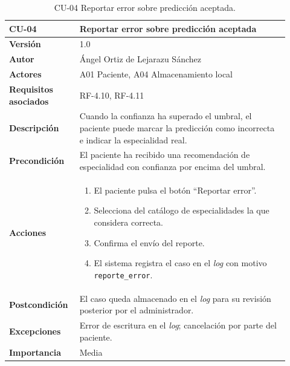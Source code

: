 \begin{table}[H]
	\centering
	\begin{tabular}{ p{0.21\linewidth} p{0.71\linewidth} }
		\toprule
		\textbf{CU-04}    & \textbf{Reportar error sobre predicción aceptada}\\
		\toprule
		\textbf{Versión}              & 1.0 \\
		\textbf{Autor}                & Ángel Ortiz de Lejarazu Sánchez \\
		\textbf{Actores}              & A01 Paciente, A04 Almacenamiento local \\
		\textbf{Requisitos asociados} & RF-4.10, RF-4.11 \\
		\textbf{Descripción}          & Cuando la confianza ha superado el umbral, el paciente puede marcar la predicción como incorrecta e indicar la especialidad real. \\
		\textbf{Precondición}         & El paciente ha recibido una recomendación de especialidad con confianza por encima del umbral. \\
		\textbf{Acciones}             &
		\begin{enumerate}
			\def\labelenumi{\arabic{enumi}.}
			\item El paciente pulsa el botón ``Reportar error''.
			\item Selecciona del catálogo de especialidades la que considera correcta.
			\item Confirma el envío del reporte.
			\item El sistema registra el caso en el \textit{log} con motivo \texttt{reporte\_error}.
		\end{enumerate} \\
		\textbf{Postcondición}        & El caso queda almacenado en el \textit{log} para su revisión posterior por el administrador. \\
		\textbf{Excepciones}          & Error de escritura en el \textit{log}; cancelación por parte del paciente. \\
		\textbf{Importancia}          & Media \\
		\bottomrule
	\end{tabular}
	\caption{CU-04 Reportar error sobre predicción aceptada.}
\end{table}

